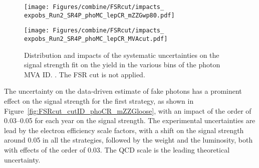 \begin{figure}
  \centering
  \texttt{[image: Figures/combine/FSRcut/impacts\_\\expobs\_Run2\_SR4P\_phoMC\_lepCR\_mZZGwp80.pdf]}
  \caption{}
  \label{fig:FSRcut_mvaID_phoMC_mZZGwp80}
\end{figure}

\begin{figure}
  \centering
  \texttt{[image: Figures/combine/FSRcut/impacts\_\\expobs\_Run2\_SR4P\_phoMC\_lepCR\_MVAcut.pdf]}
  \caption{Distribution and impacts of the systematic uncertainties on the signal strength fit
    on the yield in the various bins of the photon MVA ID.
    .
    The FSR cut is not applied.
  }
  \label{fig:FSRcut_kin_phoMC_MVAcut}
\end{figure}

The uncertainty on the data-driven estimate of fake photons has a prominent effect on the signal strength for the first strategy,
as shown in Figure~\ref{fig:FSRcut_cutID_phoCR_mZZGloose},
with an impact of the order of 0.03--0.05 for each year on the signal strength.
The experimental uncertainties are lead by the electron efficiency scale factors,
with a shift on the signal strength around 0.05 in all the strategies,
followed by the \pileup{} weight and the luminosity,
both with effects of the order of 0.03.
The QCD scale is the leading theoretical uncertainty.
